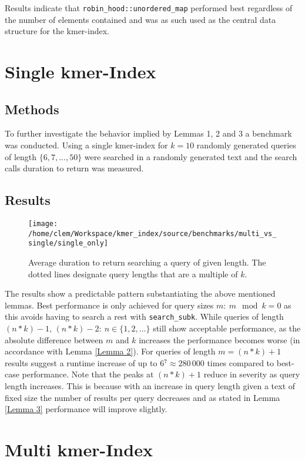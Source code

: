 Results indicate that \lstinline{robin_hood::unordered_map} performed
best regardless of the number of elements contained and was as such
used as the central data structure for the kmer-index.

\section{Single kmer-Index}
\subsection{Methods}
To further investigate the behavior implied by Lemmas 1, 2 and 3 a benchmark was conducted.
Using a single kmer-index for $k=10$ randomly generated queries of length $\{6,7,...,50\}$ were searched in a
randomly generated text and the search calls duration to return was measured.

\subsection{Results}
\begin{figure}[H]
\texttt{[image: /home/clem/Workspace/kmer\_index/source/benchmarks/multi\_vs\_single/single\_only]}

\caption{\label{figure 1} Average duration to return searching a query of given length.
The dotted lines designate query lengths that are a multiple of $k$.}
\end{figure}

The results show a predictable pattern substantiating the above mentioned
lemmas. Best performance is only achieved for query sizes $m:\:m\mod k=0$
as this avoids having to search a rest with \lstinline{search_subk}.
While queries of length $(n*k)-1,\,(n*k)-2:\:n\in\{1,2,...\}$ still
show acceptable performance, as the absolute difference between $m$
and $k$ increases the performance becomes worse (in accordance with
Lemma \ref{Lemma 2}). For queries of length $m=(n*k)+1$ results suggest
a runtime increase of up to $6{{}^7}\approx280\,000$ times compared
to best-case performance. Note that the peaks at $(n*k)+1$ reduce
in severity as query length increases. This is because with an increase
in query length given a text of fixed size the number of results per
query decreases and as stated in Lemma \ref{Lemma 3} performance will
improve slightly.

\section{Multi kmer-Index}
